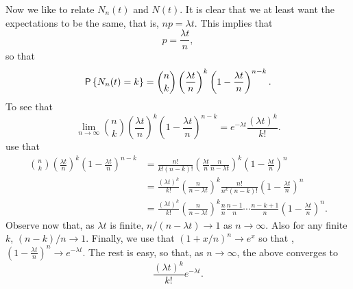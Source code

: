 \begin{question}
  \begin{solution} Now we like to relate $N_n(t)$ and $N(t)$. It is
    clear that we at least want the expectations to be the same, that
    is, $np = \lambda t$. This implies that
\begin{equation*}
  p = \frac{\lambda t}n,
\end{equation*}
so that 
\begin{equation*}
  \P{N_n(t) = k} = {n \choose k} \left(\frac{\lambda t}{n}\right)^k \left(1-\frac{\lambda t}n\right)^{n-k}.
\end{equation*}
To see that 
\begin{equation*}\label{eq:52}
  \lim_{n\to\infty} {n \choose k} \left(\frac{\lambda t}{n}\right)^k \left(1-\frac{\lambda t}n\right)^{n-k} = e^{-\lambda t} \frac{(\lambda t)^k}{k!}.
\end{equation*}
use that
    \begin{equation*}
      \begin{split}
      {n \choose k} \left(\frac{\lambda t}{n}\right)^k \left(1-\frac{\lambda t}n\right)^{n-k} 
&= \frac{n!}{k!(n-k)!} \left(\frac{\lambda t}{n}\frac{n}{n-\lambda t}\right)^k \left(1-\frac{\lambda t}n\right)^{n} \\
&= \frac{(\lambda t)^k}{k!} \left(\frac n{n-\lambda t} \right)^k  \frac{n!}{n^k(n-k)!}\left(1-\frac{\lambda t}n\right)^{n}\\
&= \frac{(\lambda t)^k}{k!} \left(\frac n{n-\lambda t} \right)^k \frac{n}{n}\frac{n-1}{n}\cdots\frac{n-k+1}{n} \left(1-\frac{\lambda t}n\right)^{n}.
\end{split}
\end{equation*}
Observe now that, as $\lambda t$ is finite, $n/(n-\lambda t)\to 1$ as
$n\to \infty$. Also for any finite $k$, $(n-k)/n\to1$. Finally, we use
that $(1+x/n)^n\to e^{x}$ so that ,
$\left(1-\frac{\lambda t}n\right)^{n} \to e^{-\lambda t}$.  The rest
is easy, so that, as $n\to\infty$,  the above converges to 
\begin{equation*}
\frac{(\lambda t)^k}{k!} e^{-\lambda t}.
\end{equation*}

  \end{solution}
\end{question}


